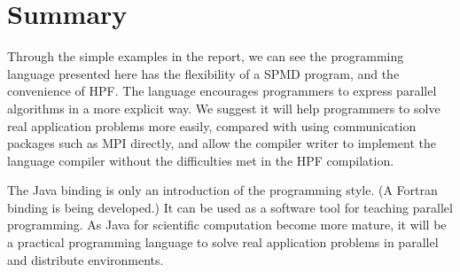 \section{Summary}

Through the simple examples in the report, we can see the programming
language presented here has the flexibility of a SPMD program, and the
convenience of HPF. The language encourages programmers to express
parallel algorithms in a more explicit way. We suggest it will help
programmers to solve real application problems more easily, compared with
using communication packages such as MPI directly, and allow the
compiler writer to implement the language compiler without the
difficulties met in the HPF compilation.

The Java binding is only an introduction of the programming style.
(A Fortran binding is being developed.) It can be used as a software
tool for teaching parallel programming.  As Java for scientific
computation become more mature, it will be a practical programming
language to solve real application problems in parallel and distribute
environments.

